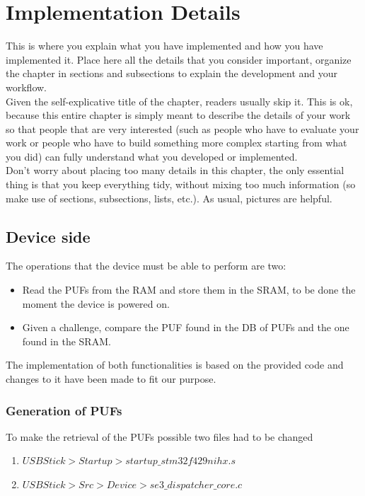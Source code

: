 \chapter{Implementation Details}
This is where you explain what you have implemented and how you have implemented it. Place here all the details that you consider important, organize the chapter in sections and subsections to explain the development and your workflow.\\Given the self-explicative title of the chapter, readers usually skip it. This is ok, because this entire chapter is simply meant to describe the details of your work so that people that are very interested (such as people who have to evaluate your work or people who have to build something more complex starting from what you did) can fully understand what you developed or implemented.\\Don't worry about placing too many details in this chapter, the only essential thing is that you keep everything tidy, without mixing too much information (so make use of sections, subsections, lists, etc.). As usual, pictures are helpful.

\section {Device side}

The operations that the device must be able to perform are two:
\begin{itemize}
	\item Read the PUFs from the RAM and store them in the SRAM, to be done the moment the device is powered on.
	\item Given a challenge,  compare the PUF found in the DB of PUFs and the one found in the SRAM.
\end{itemize}

The implementation of both functionalities is based on the provided code and changes to it have been made to fit our purpose.

\subsection{Generation of PUFs}

To make the retrieval of the PUFs possible two files had to be changed
\begin{enumerate}
	\item $USBStick > Startup > startup\_stm32f429nihx.s$
	\item $USBStick > Src > Device > se3\_dispatcher\_core.c$
\end{enumerate}

